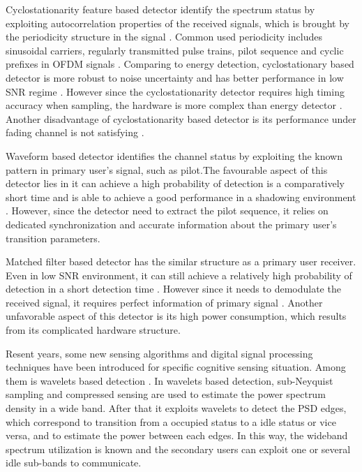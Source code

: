 Cyclostationarity feature based detector identify the spectrum status by exploiting autocorrelation properties of the received signals, which is brought by the periodicity structure in the signal \cite{goldsmith2009breaking}. Common used periodicity includes sinusoidal carriers,  regularly transmitted pulse trains, pilot sequence and cyclic prefixes in OFDM signals \cite{akyildiz2011cooperative, umar2013comparative}.  
Comparing to energy detection, cyclostationary based detector is more robust to noise uncertainty and has better performance in low SNR regime \cite{umar2013comparative}. However since the cyclostationarity detector requires high timing accuracy when sampling, the hardware is more complex than energy detector \cite{yucek2009survey}. Another disadvantage of cyclostationarity based detector is its performance under fading channel is not satisfying \cite{tandra2007snr}.   

Waveform based detector identifies the channel status by exploiting the known pattern in primary user's signal, such as pilot.The favourable aspect of this detector lies in it can achieve a high probability of detection is a comparatively short time and is able to achieve a good performance in a shadowing environment \cite{tang2005some}. However, since the detector need to extract the pilot sequence, it relies on dedicated synchronization and accurate information about the primary user's transition parameters.  

Matched filter based detector has the similar structure as a primary user receiver. Even in low SNR environment, it can still achieve a relatively high probability of detection in a short detection time \cite{tandra2005fundamental}. However since it needs to demodulate the received signal, it requires perfect information of primary signal \cite{yucek2009survey}. Another unfavorable aspect of this detector is its high power consumption, which results from its complicated hardware structure.  

Resent years, some new sensing algorithms and digital signal processing techniques have been introduced for specific cognitive sensing situation. Among them is wavelets based detection \cite{tian2007compressed, sun2013wideband, sun2013wideband2}. In wavelets based detection, sub-Neyquist sampling and compressed sensing are used to estimate the power spectrum density in a wide band. After that it exploits wavelets to detect the PSD edges, which correspond to transition from a occupied status to a idle status or vice versa, and to estimate the power between each edges. In this way, the wideband spectrum utilization is known and the secondary users can exploit one or several idle sub-bands to communicate. 

